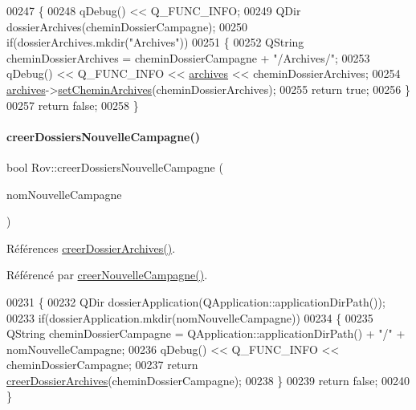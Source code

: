 \begin{DoxyCode}
00247 \{
00248     qDebug() << Q\_FUNC\_INFO;
00249     QDir dossierArchives(cheminDossierCampagne);
00250     \textcolor{keywordflow}{if}(dossierArchives.mkdir(\textcolor{stringliteral}{"Archives"}))
00251     \{
00252         QString cheminDossierArchives = cheminDossierCampagne + \textcolor{stringliteral}{"/Archives/"};
00253         qDebug() << Q\_FUNC\_INFO << \hyperlink{class_rov_ad41ed46f169f28da226a979f70c4d8a4}{archives} << cheminDossierArchives;
00254         \hyperlink{class_rov_ad41ed46f169f28da226a979f70c4d8a4}{archives}->\hyperlink{class_archives_a899e95a34c2a6f79b9a25355b5bf9cb6}{setCheminArchives}(cheminDossierArchives);
00255         \textcolor{keywordflow}{return} \textcolor{keyword}{true};
00256     \}
00257     \textcolor{keywordflow}{return} \textcolor{keyword}{false};
00258 \}
\end{DoxyCode}
\mbox{\label{class_rov_a970f36e93f9dbd22734db571b21ceb04}} 
\paragraph{\texorpdfstring{creer\+Dossiers\+Nouvelle\+Campagne()}{creerDossiersNouvelleCampagne()}}
{\footnotesize\ttfamily bool Rov\+::creer\+Dossiers\+Nouvelle\+Campagne (\begin{DoxyParamCaption}\item[{Q\+String}]{nom\+Nouvelle\+Campagne }\end{DoxyParamCaption})}



Références \hyperlink{class_rov_a53f656be57fa1eb7b93e03095a597439}{creer\+Dossier\+Archives()}.



Référencé par \hyperlink{class_rov_ae1306036b067e9ad50a09f9dd607a092}{creer\+Nouvelle\+Campagne()}.


\begin{DoxyCode}
00231 \{
00232     QDir dossierApplication(QApplication::applicationDirPath());
00233     \textcolor{keywordflow}{if}(dossierApplication.mkdir(nomNouvelleCampagne))
00234     \{
00235         QString cheminDossierCampagne = QApplication::applicationDirPath() + \textcolor{stringliteral}{"/"} + nomNouvelleCampagne;
00236         qDebug() << Q\_FUNC\_INFO << cheminDossierCampagne;
00237         \textcolor{keywordflow}{return} \hyperlink{class_rov_a53f656be57fa1eb7b93e03095a597439}{creerDossierArchives}(cheminDossierCampagne);
00238     \}
00239     \textcolor{keywordflow}{return} \textcolor{keyword}{false};
00240 \}
\end{DoxyCode}
\mbox{\label{class_rov_ae1306036b067e9ad50a09f9dd607a092}} 
